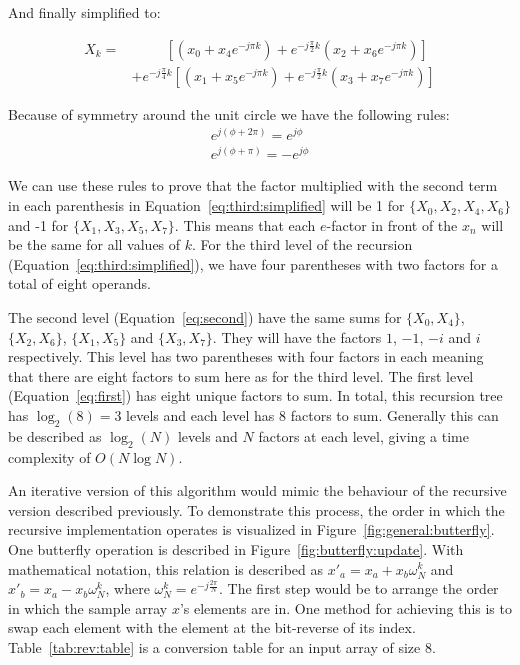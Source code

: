 And finally simplified to:

\begin{equation}
\begin{aligned}
    X_{k} =&\ \ \ \ \ \ \ \ \ \ \ \left[\left(x_0 + x_4e^{-j\pi k}\right) + e^{-j\frac{\pi}{2}k}\left(x_2 + x_6e^{-j\pi k}\right)\right]\\
           &+ e^{-j\frac{\pi}{4}k}\left[\left(x_1 + x_5e^{-j\pi k}\right) + e^{-j\frac{\pi}{2}k}\left(x_3 + x_7e^{-j\pi k}\right)\right]
\end{aligned}\label{eq:third:simplified}
\end{equation}

Because of symmetry around the unit circle we have the following rules:
\begin{gather*}
    e^{j(\phi + 2\pi)} = e^{j\phi}\\
    e^{j(\phi + \pi)} = -e^{j\phi}
\end{gather*}

We can use these rules to prove that the factor multiplied with the second term in each parenthesis in Equation~\ref{eq:third:simplified} will be 1 for $\{X_0, X_2, X_4, X_6\}$ and -1 for $\{X_1, X_3, X_5, X_7\}$. This means that each $e$-factor in front of the $x_n$ will be the same for all values of $k$. For the third level of the recursion (Equation~\ref{eq:third:simplified}), we have four parentheses with two factors for a total of eight operands.

The second level (Equation~\ref{eq:second}) have the same sums for $\{X_0, X_4\}$, $\{X_2, X_6\}$, $\{X_1, X_5\}$ and $\{X_3, X_7\}$.  They will have the factors $1$, $-1$, $-i$ and $i$ respectively. This level has two parentheses with four factors in each meaning that there are eight factors to sum here as for the third level. The first level (Equation~\ref{eq:first}) has eight unique factors to sum. In total, this recursion tree has $\log_2(8) = 3$ levels and each level has $8$ factors to sum. Generally this can be described as $\log_2(N)$ levels and $N$ factors at each level, giving a time complexity of $O(N\log{}N)$.


An iterative version of this algorithm would mimic the behaviour of the recursive version described previously. To demonstrate this process, the order in which the recursive implementation operates is visualized in Figure~\ref{fig:general:butterfly}. One butterfly operation is described in Figure~\ref{fig:butterfly:update}. With mathematical notation, this relation is described as $x'_a = x_a + x_b\omega^{k}_{N}$ and $x'_b = x_a - x_b\omega^{k}_{N}$, where $\omega^{k}_{N} = e^{-j\frac{2\pi}{N}}$. The first step would be to arrange the order in which the sample array $x$'s elements are in. One method for achieving this is to swap each element with the element at the bit-reverse of its index. Table~\ref{tab:rev:table} is a conversion table for an input array of size 8.

